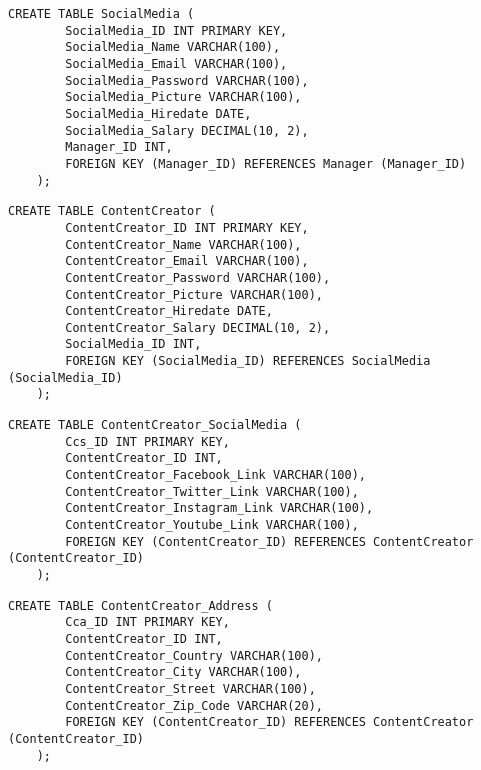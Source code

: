    \begin{lstlisting}[caption={Create SocialMedia table}, label={lst:create_socialmedia}]
    CREATE TABLE SocialMedia (
        SocialMedia_ID INT PRIMARY KEY,
        SocialMedia_Name VARCHAR(100),
        SocialMedia_Email VARCHAR(100),
        SocialMedia_Password VARCHAR(100),
        SocialMedia_Picture VARCHAR(100),
        SocialMedia_Hiredate DATE,
        SocialMedia_Salary DECIMAL(10, 2),
        Manager_ID INT,
        FOREIGN KEY (Manager_ID) REFERENCES Manager (Manager_ID)
    );
    \end{lstlisting}
    
    \begin{lstlisting}[caption={Create ContentCreator table}, label={lst:create_contentcreator}]
    CREATE TABLE ContentCreator (
        ContentCreator_ID INT PRIMARY KEY,
        ContentCreator_Name VARCHAR(100),
        ContentCreator_Email VARCHAR(100),
        ContentCreator_Password VARCHAR(100),
        ContentCreator_Picture VARCHAR(100),
        ContentCreator_Hiredate DATE,
        ContentCreator_Salary DECIMAL(10, 2),
        SocialMedia_ID INT,
        FOREIGN KEY (SocialMedia_ID) REFERENCES SocialMedia (SocialMedia_ID)
    );
    \end{lstlisting}
   
    \begin{lstlisting}[caption={Create ContentCreator SocialMedia table}, label={lst:create_contentcreator_socialmedia}]
    CREATE TABLE ContentCreator_SocialMedia (
        Ccs_ID INT PRIMARY KEY,
        ContentCreator_ID INT,
        ContentCreator_Facebook_Link VARCHAR(100),
        ContentCreator_Twitter_Link VARCHAR(100),
        ContentCreator_Instagram_Link VARCHAR(100),
        ContentCreator_Youtube_Link VARCHAR(100),
        FOREIGN KEY (ContentCreator_ID) REFERENCES ContentCreator (ContentCreator_ID)
    );
    \end{lstlisting}
    
    \begin{lstlisting}[caption={Create ContentCreator Address table}, label={lst:create_contentcreator_address}]
    CREATE TABLE ContentCreator_Address (
        Cca_ID INT PRIMARY KEY,
        ContentCreator_ID INT,
        ContentCreator_Country VARCHAR(100),
        ContentCreator_City VARCHAR(100),
        ContentCreator_Street VARCHAR(100),
        ContentCreator_Zip_Code VARCHAR(20),
        FOREIGN KEY (ContentCreator_ID) REFERENCES ContentCreator (ContentCreator_ID)
    );
    \end{lstlisting}
    
